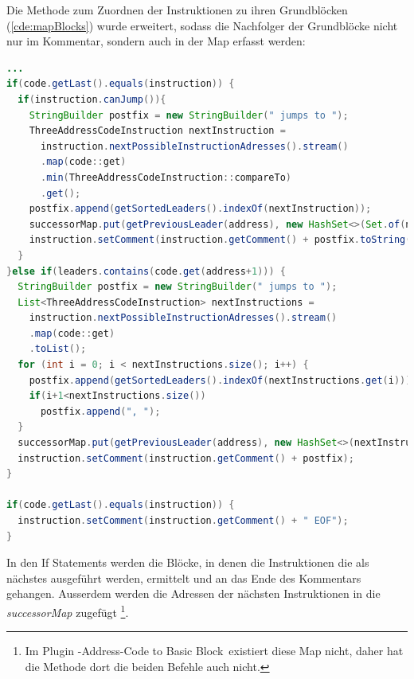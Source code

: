 Die Methode zum Zuordnen der Instruktionen zu ihren Grundblöcken (\cref{cde:mapBlocks})
wurde erweitert, sodass die Nachfolger der Grundblöcke nicht nur im Kommentar,
sondern auch in der Map erfasst werden:
\newpage
\begin{lstlisting}[language=Java, caption={Erweiterung der \textit{mapAddressesToItsBlock}-Methode}, label={cde:mapBlocks2}]
...
if(code.getLast().equals(instruction)) {
  if(instruction.canJump()){
    StringBuilder postfix = new StringBuilder(" jumps to ");
    ThreeAddressCodeInstruction nextInstruction = 
      instruction.nextPossibleInstructionAdresses().stream()
      .map(code::get)
      .min(ThreeAddressCodeInstruction::compareTo)
      .get();
    postfix.append(getSortedLeaders().indexOf(nextInstruction));
    successorMap.put(getPreviousLeader(address), new HashSet<>(Set.of(nextInstruction)));
    instruction.setComment(instruction.getComment() + postfix.toString());
  }
}else if(leaders.contains(code.get(address+1))) {
  StringBuilder postfix = new StringBuilder(" jumps to ");
  List<ThreeAddressCodeInstruction> nextInstructions = 
    instruction.nextPossibleInstructionAdresses().stream()
    .map(code::get)
    .toList();
  for (int i = 0; i < nextInstructions.size(); i++) {
    postfix.append(getSortedLeaders().indexOf(nextInstructions.get(i)));
    if(i+1<nextInstructions.size())
      postfix.append(", ");
  }
  successorMap.put(getPreviousLeader(address), new HashSet<>(nextInstructions));
  instruction.setComment(instruction.getComment() + postfix);
}

if(code.getLast().equals(instruction)) {
  instruction.setComment(instruction.getComment() + " EOF");
}
\end{lstlisting}
In den If Statements werden die Blöcke, in denen die Instruktionen die als nächstes
ausgeführt werden, ermittelt und an das Ende des Kommentars gehangen. Ausserdem
werden die Adressen der nächsten Instruktionen in die \textit{successorMap}
zugefügt
\footnote{Im Plugin -Address-Code to Basic Block\grqq\ existiert diese Map nicht, 
daher hat die Methode dort die beiden Befehle auch nicht.}.



